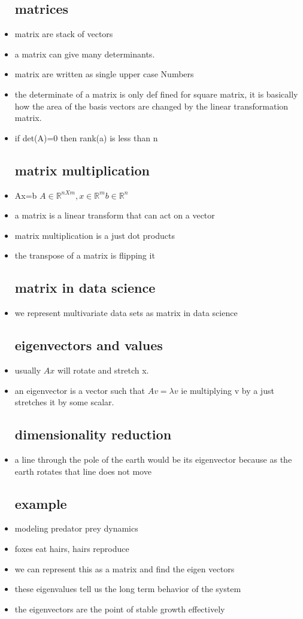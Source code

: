 \documentclass{article}
\begin{document}
\begin{itemize}
\subsection{matrices}
\item matrix are stack of vectors 
\item a matrix can give many determinants. 
\item matrix are written as single upper case Numbers 
\item the determinate of a matrix is only def fined for square matrix, it is basically how the area of the basis vectors are changed by the linear transformation matrix.
\item if det(A)=0 then rank(a) is less than n 
\subsection{matrix multiplication}
\item Ax=b $A\in \mathbb{R}^{nXm}, x\in \mathbb{R}^{m} b\in \mathbb{R}^{n}$
\item a matrix is a linear transform that can act on a vector
\item matrix multiplication is a just dot products
\item the transpose of a matrix is flipping it \subsection{matrix in data science}
\item we represent multivariate data sets as matrix in data science
\subsection{eigenvectors and values}
\item usually $Ax$ will rotate and stretch x.
\item an eigenvector is a vector such that $Av=\lambda v$ ie multiplying v by a just stretches it by some scalar. 
\subsection{ dimensionality  reduction}
\item a line through the pole of the earth would be its eigenvector because as the earth rotates that line does not move
\subsection{example}
\item modeling predator prey dynamics 
\item foxes eat hairs, hairs reproduce
\item  we can represent this as a matrix and find the eigen vectors
\item these eigenvalues tell us the long term behavior of the system 
\item the eigenvectors are the point of stable growth effectively 

\end{itemize}
\end{document}
